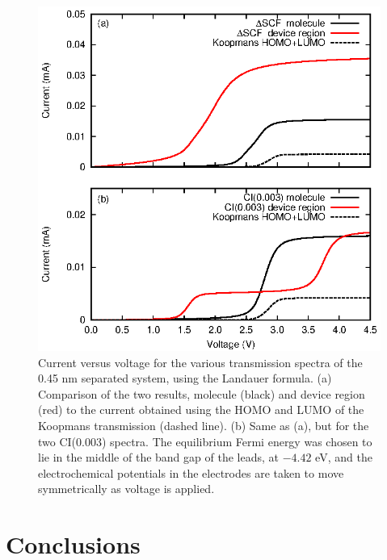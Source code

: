 \begin{figure}
	\begin{center}
		\includegraphics[width=0.9\linewidth]{figures/figure9a_9b}
	\end{center}
	\caption{Current versus voltage for the various transmission
	         spectra of the 0.45 nm separated system, using the
		 Landauer formula. (a) Comparison of the two \dscf results,
		 molecule (black) and device region (red) to the current
		 obtained using the HOMO and LUMO of the Koopmans
		 transmission (dashed line). (b) Same as (a), but for the
		 two CI(0.003) spectra.
		 The equilibrium Fermi
		 energy was chosen to lie in the middle of the band gap
		 of the leads, at $-4.42$ eV, and the electrochemical
		 potentials in the electrodes are taken to move symmetrically
		 as voltage is applied.}
	\label{fig:iv}
\end{figure}
 
\section{Conclusions}
\label{sec:conclusions}

